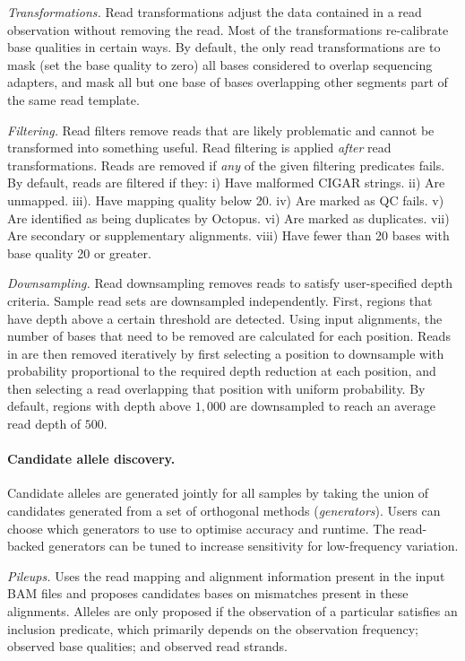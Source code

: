 \documentclass[notitlepage, twocolumn, 10pt]{article}
\begin{document}
\vspace{3mm}
\noindent\emph{Transformations.} Read transformations adjust the data contained in a read observation without removing the read. Most of the transformations re-calibrate base qualities in certain ways. By default, the only read transformations are to mask (set the base quality to zero) all bases considered to overlap sequencing adapters, and mask all but one base of bases overlapping other segments part of the same read template.

\vspace{3mm}
\noindent\emph{Filtering.} Read filters remove reads that are likely problematic and cannot be transformed into something useful. Read filtering is applied \emph{after} read transformations. Reads are removed if \emph{any} of the given filtering predicates fails. By default, reads are filtered if they: i) Have malformed CIGAR strings. ii) Are unmapped. iii). Have mapping quality below 20. iv) Are marked as QC fails. v) Are identified as being duplicates by Octopus. vi) Are marked as duplicates. vii) Are secondary or supplementary alignments. viii) Have fewer than 20 bases with base quality 20 or greater.

\vspace{3mm}
\noindent\emph{Downsampling.} Read downsampling removes reads to satisfy user-specified depth criteria. Sample read sets are downsampled independently. First, regions that have depth above a certain threshold are detected. Using input alignments, the number of bases that need to be removed are calculated for each position. Reads in  are then removed iteratively by first selecting a position to downsample with probability proportional to the required depth reduction at each position, and then selecting a read overlapping that position with uniform probability. By default, regions with depth above $1,000$ are downsampled to reach an average read depth of $500$.

\paragraph*{Candidate allele discovery.} Candidate alleles are generated jointly for all samples by taking the union of candidates generated from a set of orthogonal methods (\emph{generators}). Users can choose which generators to use to optimise accuracy and runtime. The read-backed generators can be tuned to increase sensitivity for low-frequency variation.

\vspace{3mm}
\noindent\emph{Pileups.} Uses the read mapping and alignment information present in the input BAM files and proposes candidates bases on mismatches present in these alignments. Alleles are only proposed if the observation of a particular satisfies an inclusion predicate, which primarily depends on the observation frequency; observed base qualities; and observed read strands.
\end{document}

